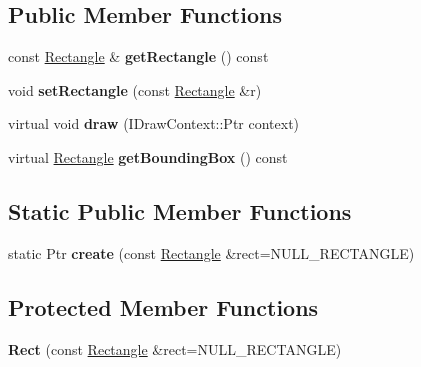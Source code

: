 \subsection*{Public Member Functions}
\begin{DoxyCompactItemize}
\item 
\hypertarget{classsambag_1_1disco_1_1graphic_elements_1_1_rect_ac438dc164da29d27f9dc53a9f802cb7f}{
const \hyperlink{classsambag_1_1com_1_1_rectangle}{Rectangle} \& {\bfseries getRectangle} () const }
\label{classsambag_1_1disco_1_1graphic_elements_1_1_rect_ac438dc164da29d27f9dc53a9f802cb7f}

\item 
\hypertarget{classsambag_1_1disco_1_1graphic_elements_1_1_rect_af4a07543054a006831b16fa51ded12a7}{
void {\bfseries setRectangle} (const \hyperlink{classsambag_1_1com_1_1_rectangle}{Rectangle} \&r)}
\label{classsambag_1_1disco_1_1graphic_elements_1_1_rect_af4a07543054a006831b16fa51ded12a7}

\item 
\hypertarget{classsambag_1_1disco_1_1graphic_elements_1_1_rect_a15d3b855152772bd3142f759a9777f65}{
virtual void {\bfseries draw} (IDrawContext::Ptr context)}
\label{classsambag_1_1disco_1_1graphic_elements_1_1_rect_a15d3b855152772bd3142f759a9777f65}

\item 
\hypertarget{classsambag_1_1disco_1_1graphic_elements_1_1_rect_aa40fa58c63ff2ff92d64cbb43b75cb9b}{
virtual \hyperlink{classsambag_1_1com_1_1_rectangle}{Rectangle} {\bfseries getBoundingBox} () const }
\label{classsambag_1_1disco_1_1graphic_elements_1_1_rect_aa40fa58c63ff2ff92d64cbb43b75cb9b}

\end{DoxyCompactItemize}
\subsection*{Static Public Member Functions}
\begin{DoxyCompactItemize}
\item 
\hypertarget{classsambag_1_1disco_1_1graphic_elements_1_1_rect_a6ab71eda840abdcc483f933d9c94532c}{
static Ptr {\bfseries create} (const \hyperlink{classsambag_1_1com_1_1_rectangle}{Rectangle} \&rect=NULL\_\-RECTANGLE)}
\label{classsambag_1_1disco_1_1graphic_elements_1_1_rect_a6ab71eda840abdcc483f933d9c94532c}

\end{DoxyCompactItemize}
\subsection*{Protected Member Functions}
\begin{DoxyCompactItemize}
\item 
\hypertarget{classsambag_1_1disco_1_1graphic_elements_1_1_rect_a2fa724238b2552481d9b77c92395da09}{
{\bfseries Rect} (const \hyperlink{classsambag_1_1com_1_1_rectangle}{Rectangle} \&rect=NULL\_\-RECTANGLE)}
\label{classsambag_1_1disco_1_1graphic_elements_1_1_rect_a2fa724238b2552481d9b77c92395da09}

\end{DoxyCompactItemize}
